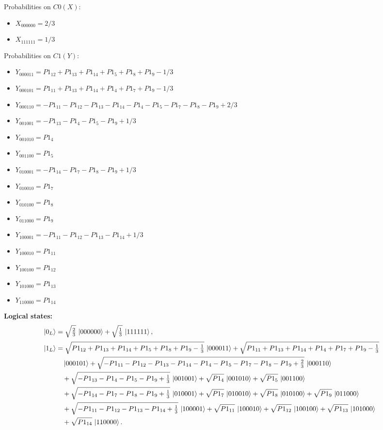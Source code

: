 \documentclass[11pt]{article}
\begin{document}
Probabilities on $C0 (X)$:
\begin{itemize}
    \item $X_{000000} = 2/3$
    \item $X_{111111} = 1/3$
\end{itemize}

Probabilities on $C1 (Y)$:
\begin{itemize}
    \item $Y_{000011} = P1_{12} + P1_{13} + P1_{14} + P1_5 + P1_8 + P1_9 - 1/3$
    \item $Y_{000101} = P1_{11} + P1_{13} + P1_{14} + P1_4 + P1_7 + P1_9 - 1/3$
    \item $Y_{000110} = -P1_{11} - P1_{12} - P1_{13} - P1_{14} - P1_4 - P1_5 - P1_7 - P1_8 - P1_9 + 2/3$
    \item $Y_{001001} = -P1_{13} - P1_4 - P1_5 - P1_9 + 1/3$
    \item $Y_{001010} = P1_4$
    \item $Y_{001100} = P1_5$
    \item $Y_{010001} = -P1_{14} - P1_7 - P1_8 - P1_9 + 1/3$
    \item $Y_{010010} = P1_7$
    \item $Y_{010100} = P1_8$
    \item $Y_{011000} = P1_9$
    \item $Y_{100001} = -P1_{11} - P1_{12} - P1_{13} - P1_{14} + 1/3$
    \item $Y_{100010} = P1_{11}$
    \item $Y_{100100} = P1_{12}$
    \item $Y_{101000} = P1_{13}$
    \item $Y_{110000} = P1_{14}$
\end{itemize}

\noindent\textbf{Logical states:}
\begin{align*}
\ket{0_L} &= \sqrt{\tfrac{2}{3}}\,\ket{000000} + \sqrt{\tfrac{1}{3}}\,\ket{111111},
\\[2pt]
\ket{1_L} &= \sqrt{P1_{12} + P1_{13} + P1_{14} + P1_5 + P1_8 + P1_9 - \tfrac{1}{3}}\,\ket{000011} + \sqrt{P1_{11} + P1_{13} + P1_{14} + P1_4 + P1_7 + P1_9 - \tfrac{1}{3}}\,\\
&\quad \ket{000101} + \sqrt{-P1_{11} - P1_{12} - P1_{13} - P1_{14} - P1_4 - P1_5 - P1_7 - P1_8 - P1_9 + \tfrac{2}{3}}\,\ket{000110}\\
&\quad + \sqrt{-P1_{13} - P1_4 - P1_5 - P1_9 + \tfrac{1}{3}}\,\ket{001001} + \sqrt{P1_4}\,\ket{001010} + \sqrt{P1_5}\,\ket{001100}\\
&\quad + \sqrt{-P1_{14} - P1_7 - P1_8 - P1_9 + \tfrac{1}{3}}\,\ket{010001} + \sqrt{P1_7}\,\ket{010010} + \sqrt{P1_8}\,\ket{010100} + \sqrt{P1_9}\,\ket{011000}\\
&\quad+ \sqrt{-P1_{11} - P1_{12} - P1_{13} - P1_{14} + \tfrac{1}{3}}\,\ket{100001} + \sqrt{P1_{11}}\,\ket{100010} + \sqrt{P1_{12}}\,\ket{100100} + \sqrt{P1_{13}}\,\ket{101000}\\
&\quad + \sqrt{P1_{14}}\,\ket{110000}.
\end{align*}
\end{document}
